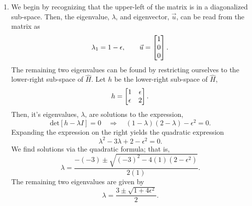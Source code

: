 \documentclass[a4paper, 12pt]{config/homework}
\begin{document}
\begin{enumerate}
\begin{enumerate}[label=(\alph*)]
\pagebreak
\item We begin by recognizing that the upper-left of the matrix is in a diagonalized sub-space. Then, the eigenvalue, \(\lambda\), and eigenvector, \(\vec{u}\), can be read from the matrix as
\[\lambda_1 = 1-\epsilon, \qquad \vec{u}=\left[ \begin{matrix} 1 \\ 0 \\ 0 \end{matrix} \right].\]
The remaining two eigenvalues can be found by restricting ourselves to the lower-right sub-space of \(\hat{H}\). Let \(h\) be the lower-right sub-space of \(\hat{H}\),
\[h = \left[ \begin{matrix} 1 & \epsilon \\ \epsilon & 2 \end{matrix} \right].\]
Then, it's eigenvalues, \(\lambda\), are solutions to the expression,
\[\text{det}\left[h - \lambda I\right] = 0 \quad\Rightarrow\quad \left(1-\lambda\right)(2-\lambda) - \epsilon^2 = 0.\]
Expanding the expression on the right yields the quadratic expression
\[\lambda^2 - 3\lambda + 2 - \epsilon^2 = 0.\]
We find solutions via the quadratic formula; that is,
\[\lambda = \frac{-(-3) \pm \sqrt{(-3)^2 -4(1)(2-\epsilon^2)}}{2(1)}.\]
The remaining two eigenvalues are given by
\[\lambda = \frac{3\pm\sqrt{1+4\epsilon^2}}{2}.\]
\end{enumerate}
\end{enumerate}
\end{document}
